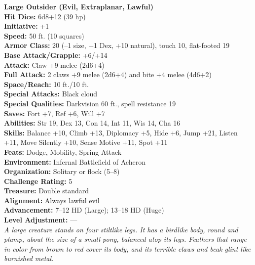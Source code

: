\documentclass[DIV=14, paper=a4, fontsize=10pt, twocolumn, twoside]{scrartcl}
\begin{document}
\textbf{Large Outsider (Evil, Extraplanar, Lawful)}\\
\textbf{Hit Dice:} 6d8+12 (39 hp)\\
\textbf{Initiative:} +1\\
\textbf{Speed:} 50 ft. (10 squares)\\
\textbf{Armor Class:} 20 (–1 size, +1 Dex, +10 natural), touch 10, flat-footed 19\\
\textbf{Base Attack/Grapple:} +6/+14\\
\textbf{Attack:} Claw +9 melee (2d6+4)\\
\textbf{Full Attack:} 2 claws +9 melee (2d6+4) and bite +4 melee (4d6+2)\\
\textbf{Space/Reach:} 10 ft./10 ft.\\
\textbf{Special Attacks:} Black cloud\\
\textbf{Special Qualities:} Darkvision 60 ft., spell resistance 19\\
\textbf{Saves:} Fort +7, Ref +6, Will +7\\
\textbf{Abilities:} Str 19, Dex 13, Con 14, Int 11, Wis 14, Cha 16\\
\textbf{Skills:} Balance +10, Climb +13, Diplomacy +5, Hide +6, Jump +21, Listen +11, Move Silently +10, Sense Motive +11, Spot +11\\
\textbf{Feats:} Dodge, Mobility, Spring Attack\\
\textbf{Environment:} Infernal Battlefield of Acheron\\
\textbf{Organization:} Solitary or flock (5–8)\\
\textbf{Challenge Rating:} 5\\
\textbf{Treasure:} Double standard\\
\textbf{Alignment:} Always lawful evil\\
\textbf{Advancement:} 7–12 HD (Large); 13–18 HD (Huge)\\
\textbf{Level Adjustment:} —\\

\noindent\textit{A large creature stands on four stiltlike legs. It has a birdlike body, round and plump, about the size of a small pony, balanced atop its legs. Feathers that range in color from brown to red cover its body, and its terrible claws and beak glint like burnished metal.}\\

\\
\end{document}
